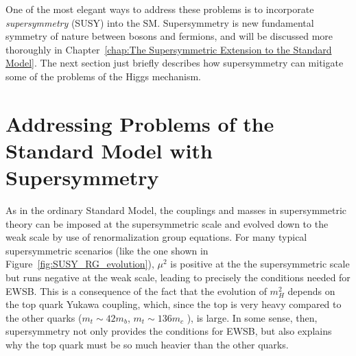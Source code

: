\documentclass[dissertation.tex]{subfiles}
\begin{document}
One of the most elegant ways to address these problems is to incorporate \textit{supersymmetry} (SUSY) into the SM.  Supersymmetry is new fundamental symmetry of nature between bosons and fermions, and will be discussed more thoroughly in Chapter~\ref{chap:The Supersymmetric Extension to the Standard Model}.  The next section just briefly describes how supersymmetry can mitigate some of the problems of the Higgs mechanism.

\section{Addressing Problems of the Standard Model with Supersymmetry}
\label{sec:Addressing Problems of the Standard Model with Supersymmetry}

As in the ordinary Standard Model, the couplings and masses in supersymmetric theory can be imposed at the supersymmetric scale and evolved down to the weak scale by use of renormalization group equations.  For many typical supersymmetric scenarios (like the one shown in Figure~\ref{fig:SUSY_RG_evolution}), $\mu^{2}$ is positive at the the supersymmetric scale but runs negative at the weak scale, leading to precisely the conditions needed for EWSB.  This is a consequence of the fact that the evolution of $m_{H}^{2}$ depends on the top quark Yukawa coupling, which, since the top is very heavy compared to the other quarks ($m_{t}\sim42m_{b}$, $m_{t}\sim136m_{c}$ \cite{0954-3899-37-7A-075021}), is large.  In some sense, then, supersymmetry not only provides the conditions for EWSB, but also explains why the top quark must be so much heavier than the other quarks.
\end{document}
